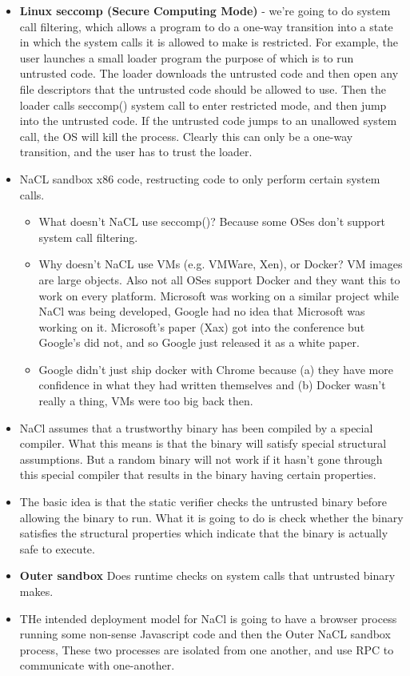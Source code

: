 \documentclass[12pt]{article}
\theoremstyle{definition}
\begin{document}
\begin{itemize}
    \item \textbf{Linux seccomp (Secure Computing Mode)} - we're going to do system call filtering, which allows a program to do a one-way transition into a state in which the system calls it is allowed to make is restricted. For example, the user launches a small loader program the purpose of which is to run untrusted code. The loader downloads the untrusted code and then open any file descriptors that the untrusted code should be allowed to use. Then the loader calls seccomp() system call to enter restricted mode, and then jump into the untrusted code. If the untrusted code jumps to an unallowed system call, the OS will kill the process. Clearly this can only be a one-way transition, and the user has to trust the loader.
    \item NaCL sandbox x86 code, restructing code to only perform certain system calls.
    \begin{itemize}
        \item What doesn't NaCL use seccomp()? Because some OSes don't support system call filtering. 
        \item Why doesn't NaCL use VMs (e.g. VMWare, Xen), or Docker? VM images are large objects. Also not all OSes support Docker and they want this to work on every platform. Microsoft was working on a similar project while NaCl was being developed, Google had no idea that Microsoft was working on it. Microsoft's paper (Xax) got into the conference but Google's did not, and so Google just released it as a white paper.
        \item Google didn't just ship docker with Chrome because (a) they have more confidence in what they had written themselves and (b) Docker wasn't really a thing, VMs were too big back then.
    \end{itemize}
    \item NaCl assumes that a trustworthy binary has been compiled by a special compiler. What this means is that the binary will satisfy special structural assumptions. But a random binary will not work if it hasn't gone through this special compiler that results in the binary having certain properties. 
    \item The basic idea is that the static verifier checks the untrusted binary before allowing the binary to run. What it is going to do is check whether the binary satisfies the structural properties which indicate that the binary is actually safe to execute.
    \item \textbf{Outer sandbox} Does runtime checks on system calls that untrusted binary makes.
    \item THe intended deployment model for NaCl is going to have a browser process running some non-sense Javascript code and then the Outer NaCL sandbox process, These two processes are isolated  from one another, and use RPC to communicate with one-another.
\end{itemize}
\end{document}

